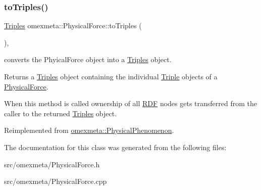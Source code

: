 \subsubsection{\texorpdfstring{to\+Triples()}{toTriples()}}
{\footnotesize\ttfamily \hyperlink{classomexmeta_1_1Triples}{Triples} omexmeta\+::\+Physical\+Force\+::to\+Triples (\begin{DoxyParamCaption}{ }\end{DoxyParamCaption})\hspace{0.3cm}{\ttfamily [override]}, {\ttfamily [virtual]}}



converts the Phyical\+Force object into a \hyperlink{classomexmeta_1_1Triples}{Triples} object. 

\begin{DoxyReturn}{Returns}
a \hyperlink{classomexmeta_1_1Triples}{Triples} object containing the individual \hyperlink{classomexmeta_1_1Triple}{Triple} objects of a \hyperlink{classomexmeta_1_1PhysicalForce}{Physical\+Force}.
\end{DoxyReturn}
When this method is called ownership of all \hyperlink{classomexmeta_1_1RDF}{R\+DF} nodes gets transferred from the caller to the returned \hyperlink{classomexmeta_1_1Triples}{Triples} object. 

Reimplemented from \hyperlink{classomexmeta_1_1PhysicalPhenomenon_a30617e685bd8b155a76d38ab5a9db273}{omexmeta\+::\+Physical\+Phenomenon}.



The documentation for this class was generated from the following files\+:\begin{DoxyCompactItemize}
\item 
src/omexmeta/Physical\+Force.\+h\item 
src/omexmeta/Physical\+Force.\+cpp\end{DoxyCompactItemize}
